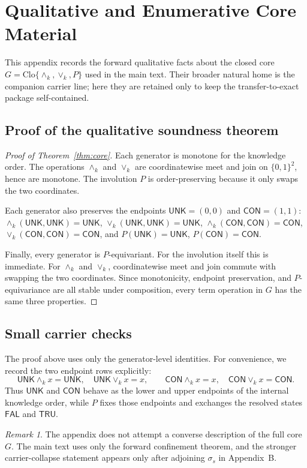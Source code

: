 \documentclass[11pt]{article}
\theoremstyle{remark}
\newtheorem*{remark}{Remark}
\newcommand{\UNK}{\ensuremath{\mathsf{UNK}}}
\newcommand{\FAL}{\ensuremath{\mathsf{FAL}}}
\newcommand{\TRU}{\ensuremath{\mathsf{TRU}}}
\newcommand{\CON}{\ensuremath{\mathsf{CON}}}
\newcommand{\meetk}{\ensuremath{\wedge_k}}
\newcommand{\joink}{\ensuremath{\vee_k}}
\newcommand{\Clo}{\ensuremath{\mathrm{Clo}}}
\begin{document}
\appendix

\section{Qualitative and Enumerative Core Material}

This appendix records the forward qualitative facts about the closed core
$G=\Clo\{\meetk,\joink,P\}$ used in the main text. Their broader natural
home is the companion carrier line; here they are retained only to keep the
transfer-to-exact package self-contained.

\subsection{Proof of the qualitative soundness theorem}

\begin{proof}[Proof of Theorem~\ref{thm:core}]
Each generator is monotone for the knowledge order. The operations $\meetk$
and $\joink$ are coordinatewise meet and join on $\{0,1\}^2$, hence are
monotone. The involution $P$ is order-preserving because it only swaps the
two coordinates.

Each generator also preserves the endpoints $\UNK=(0,0)$ and $\CON=(1,1)$:
$\meetk(\UNK,\UNK)=\UNK$, $\joink(\UNK,\UNK)=\UNK$,
$\meetk(\CON,\CON)=\CON$, $\joink(\CON,\CON)=\CON$, and $P(\UNK)=\UNK$,
$P(\CON)=\CON$.

Finally, every generator is $P$-equivariant. For the involution itself this
is immediate. For $\meetk$ and $\joink$, coordinatewise meet and join
commute with swapping the two coordinates. Since monotonicity, endpoint
preservation, and $P$-equivariance are all stable under composition, every
term operation in $G$ has the same three properties.
\end{proof}

\subsection{Small carrier checks}

The proof above uses only the generator-level identities. For convenience,
we record the two endpoint rows explicitly:
\[
\UNK\meetk x=\UNK,\quad \UNK\joink x=x,\qquad
\CON\meetk x=x,\quad \CON\joink x=\CON.
\]
Thus $\UNK$ and $\CON$ behave as the lower and upper endpoints of the
internal knowledge order, while $P$ fixes those endpoints and exchanges the
resolved states $\FAL$ and $\TRU$.

\begin{remark}
The appendix does not attempt a converse description of the full core $G$.
The main text uses only the forward confinement theorem, and the stronger
carrier-collapse statement appears only after adjoining $\sigma_s$ in
Appendix~B.
\end{remark}
\end{document}
